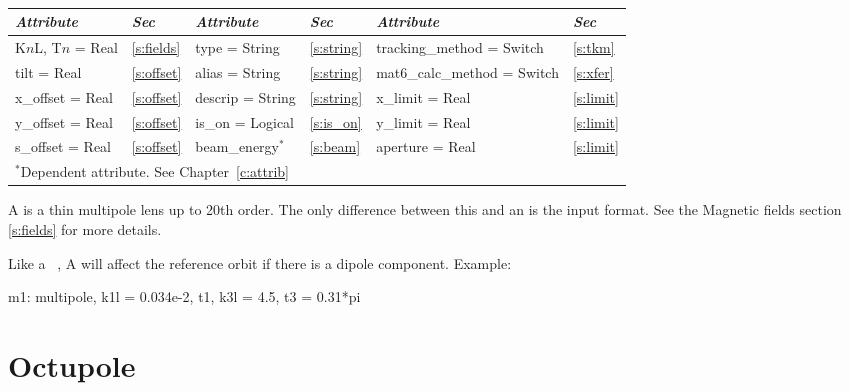 {{\begin{center}
\tt
\begin{tabular}{|l|l||l|l||l|l|} \hline
  {\sl Attribute} & {\sl Sec}  & {\sl Attribute} & {\sl Sec} & {\sl Attribute} & {\sl Sec} \\ \hline
  K$n$L, T$n$ = Real &  \ref{s:fields} &  type = String                & \ref{s:string} & tracking\_method = Switch   & \ref{s:tkm}   \\ \hline
  tilt       = Real  &  \ref{s:offset} &  alias = String               & \ref{s:string} & mat6\_calc\_method = Switch & \ref{s:xfer}  \\ \hline
  x\_offset  = Real  &  \ref{s:offset} &  descrip = String             & \ref{s:string} & x\_limit = Real             & \ref{s:limit} \\ \hline
  y\_offset  = Real  &  \ref{s:offset} &  is\_on = Logical             & \ref{s:is_on}  & y\_limit = Real             & \ref{s:limit} \\ \hline
  s\_offset  = Real  &  \ref{s:offset} &  beam\_energy$^*$             & \ref{s:beam}   & aperture = Real             & \ref{s:limit} \\ \hline
  \multicolumn{6}{l}{\small $^*$Dependent attribute. See Chapter~\ref{c:attrib}} \\
\end{tabular}
\end{center}
\toffset

A  is a thin multipole lens up to 20th order. The only
difference between this and an  is the input format. See the 
Magnetic fields section \ref{s:fields} for more details.

Like a \mad\ , A \bmad {} will affect the
reference orbit if there is a dipole component. 
Example:
\begin{example}
  m1: multipole, k1l = 0.034e-2, t1, k3l = 4.5, t3 = 0.31*pi
\end{example}

\section{Octupole}
\label{s:oct}

}}
